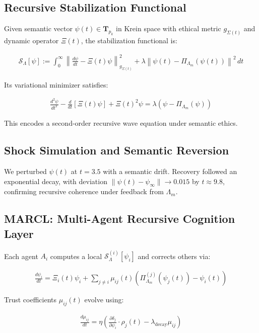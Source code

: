 \documentclass[11pt]{article}
\begin{document}
\subsection{Recursive Stabilization Functional}

Given semantic vector $\psi(t) \in \mathbf{T}_{p_k}$ in Krein space with ethical metric $g_{\Sigma(t)}$ and dynamic operator $\Xi(t)$, the stabilization functional is:

\begin{align}
\mathcal{S}_{\Lambda}[\psi] := \int_0^\infty \left\|
\frac{d\psi}{dt} - \Xi(t)\psi \right\|^2_{g_{\Sigma(t)}} + 
\lambda \left\| \psi(t) - \Pi_{\Lambda_m}(\psi(t)) \right\|^2 \, dt
\end{align}

Its variational minimizer satisfies:

\begin{align}
\frac{d^2 \psi}{dt^2} - \frac{d}{dt}[\Xi(t)\psi] + \Xi(t)^2 \psi 
= \lambda (\psi - \Pi_{\Lambda_m}(\psi))
\end{align}

This encodes a second-order recursive wave equation under semantic ethics.

\subsection{Shock Simulation and Semantic Reversion}

We perturbed $\psi(t)$ at $t = 3.5$ with a semantic drift. Recovery followed an exponential decay, with deviation $\|\psi(t) - \psi_\infty\| \to 0.015$ by $t \approx 9.8$, confirming recursive coherence under feedback from $\Lambda_m$.

\subsection{MARCL: Multi-Agent Recursive Cognition Layer}

Each agent $A_i$ computes a local $\mathcal{S}_{\Lambda}^{(i)}[\psi_i]$ and corrects others via:

\begin{align}
\frac{d\psi_i}{dt} = \Xi_i(t)\psi_i + \sum_{j \neq i} \mu_{ij}(t) \left( \Pi_{\Lambda_m}^{(j)}(\psi_j(t)) - \psi_i(t) \right)
\end{align}

Trust coefficients $\mu_{ij}(t)$ evolve using:

\begin{align}
\frac{d\mu_{ij}}{dt} = \eta \left( \frac{\partial \delta_j}{\partial \psi_i} \cdot \rho_j(t) - \lambda_{\text{decay}} \mu_{ij} \right)
\end{align}
\end{document}
